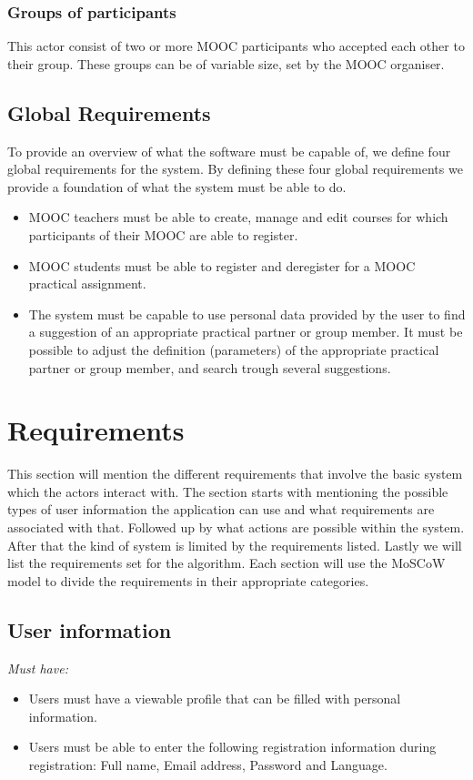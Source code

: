 \documentclass[]{article}
\newcommand{\reqr}[1]{{\noindent\emph{#1:}}}
\begin{document}
\subsubsection{Groups of participants}
This actor consist of two or more MOOC participants who accepted each other to their group.
These groups can be of variable size, set by the MOOC organiser.

\subsection{Global Requirements}
To provide an overview of what the software must be capable of, we define four global requirements for the system.
By defining these four global requirements we provide a foundation of what the system must be able to do.
\begin{itemize}
\item MOOC teachers must be able to create, manage and edit courses for which participants of their MOOC are able to register.

\item MOOC students must be able to register and deregister for a MOOC practical assignment.

\item The system must be capable to use personal data provided by the user to find a suggestion of an appropriate practical partner or group member.
It must be possible to adjust the definition (parameters) of the appropriate practical partner or group member, and search trough several suggestions.
\end{itemize}

\section{Requirements}
This section will mention the different requirements that involve the basic system which the actors interact with.
The section starts with mentioning the possible types of user information the application can use and what requirements are associated with that.
Followed up by what actions are possible within the system.
After that the kind of system is limited by the requirements listed.
Lastly we will list the requirements set for the algorithm.
Each section will use the MoSCoW model to divide the requirements in their appropriate categories.


\subsection{User information}
\reqr{Must have}
\begin{itemize}
\item Users must have a viewable profile that can be filled with personal information.
\item Users must be able to enter the following registration information during registration: Full name, Email address, Password and Language.
\end{itemize}
\end{document}
